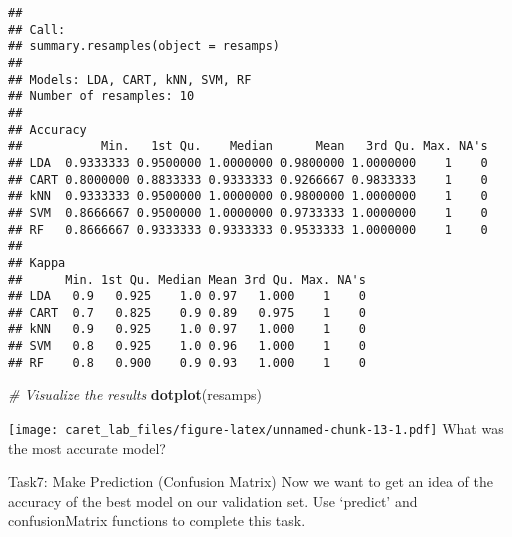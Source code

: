 \documentclass[
]{article}
\newenvironment{Shaded}{\begin{snugshade}}{\end{snugshade}}
\newcommand{\AttributeTok}[1]{\textcolor[rgb]{0.13,0.29,0.53}{#1}}
\newcommand{\CommentTok}[1]{\textcolor[rgb]{0.56,0.35,0.01}{\textit{#1}}}
\newcommand{\FunctionTok}[1]{\textcolor[rgb]{0.13,0.29,0.53}{\textbf{#1}}}
\newcommand{\NormalTok}[1]{#1}
\newcommand{\OtherTok}[1]{\textcolor[rgb]{0.56,0.35,0.01}{#1}}
\newcommand{\SpecialCharTok}[1]{\textcolor[rgb]{0.81,0.36,0.00}{\textbf{#1}}}
\begin{document}
\begin{verbatim}
## 
## Call:
## summary.resamples(object = resamps)
## 
## Models: LDA, CART, kNN, SVM, RF 
## Number of resamples: 10 
## 
## Accuracy 
##           Min.   1st Qu.    Median      Mean   3rd Qu. Max. NA's
## LDA  0.9333333 0.9500000 1.0000000 0.9800000 1.0000000    1    0
## CART 0.8000000 0.8833333 0.9333333 0.9266667 0.9833333    1    0
## kNN  0.9333333 0.9500000 1.0000000 0.9800000 1.0000000    1    0
## SVM  0.8666667 0.9500000 1.0000000 0.9733333 1.0000000    1    0
## RF   0.8666667 0.9333333 0.9333333 0.9533333 1.0000000    1    0
## 
## Kappa 
##      Min. 1st Qu. Median Mean 3rd Qu. Max. NA's
## LDA   0.9   0.925    1.0 0.97   1.000    1    0
## CART  0.7   0.825    0.9 0.89   0.975    1    0
## kNN   0.9   0.925    1.0 0.97   1.000    1    0
## SVM   0.8   0.925    1.0 0.96   1.000    1    0
## RF    0.8   0.900    0.9 0.93   1.000    1    0
\end{verbatim}

\begin{Shaded}
\begin{Highlighting}[]
\CommentTok{\# Visualize the results}
\FunctionTok{dotplot}\NormalTok{(resamps)}
\end{Highlighting}
\end{Shaded}

\texttt{[image: caret\_lab\_files/figure-latex/unnamed-chunk-13-1.pdf]}
What was the most accurate model?

Task7: Make Prediction (Confusion Matrix) Now we want to get an idea of
the accuracy of the best model on our validation set. Use `predict' and
confusionMatrix functions to complete this task.

\begin{Shaded}
\end{Shaded}
\end{document}
